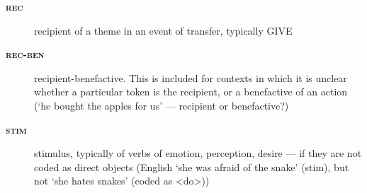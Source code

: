 \documentclass[output=paper,colorlinks,citecolor=brown,collectionchapter]{langscibook}
\begin{document}
\begin{description}
\item[\bfseries\upshape\textsc{rec}] {recipient} of a theme in an event of {transfer}, typically GIVE
\item[\bfseries\upshape\textsc{rec-ben}] recipient-{benefactive}. This is included for contexts in which it is unclear whether a particular token is the {recipient}, or a {benefactive} of an action (`he bought the apples for us' --- {recipient} or {benefactive}?)
\item[\bfseries\upshape\textsc{stim}] {stimulus}, typically of verbs of emotion, perception, desire --- if they are not coded as direct objects (English `she was afraid of the snake' (stim), but not `she hates snakes' (coded as <do>))
\end{description}
\z

\end{document}
